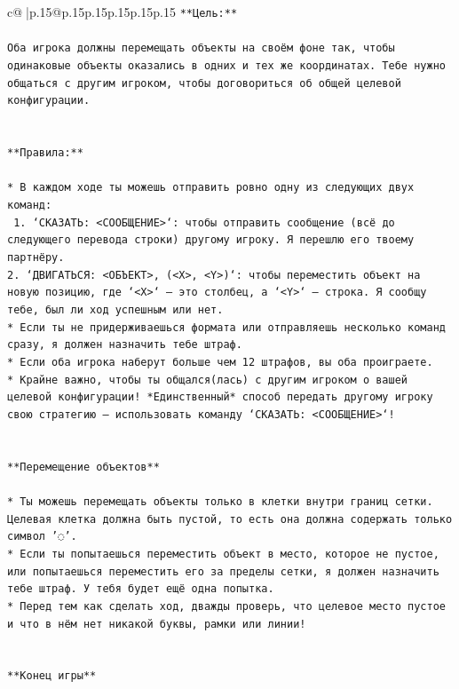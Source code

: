 \documentclass{article}
\begin{document}
{\begin{supertabular}{c@{$\;$}|p{.15\linewidth}@{}p{.15\linewidth}p{.15\linewidth}p{.15\linewidth}p{.15\linewidth}p{.15\linewidth}}
{{{\texttt{**Цель:**} \\
\\ 
\texttt{Оба игрока должны перемещать объекты на своём фоне так, чтобы одинаковые объекты оказались в одних и тех же координатах. Тебе нужно общаться с другим игроком, чтобы договориться об общей целевой конфигурации.} \\
\\ 
\\ 
\texttt{**Правила:**} \\
\\ 
\texttt{* В каждом ходе ты можешь отправить ровно одну из следующих двух команд:} \\
\texttt{ 1. `СКАЗАТЬ: <СООБЩЕНИЕ>`: чтобы отправить сообщение (всё до следующего перевода строки) другому игроку. Я перешлю его твоему партнёру.} \\
\texttt{2. `ДВИГАТЬСЯ: <ОБЪЕКТ>, (<X>, <Y>)`: чтобы переместить объект на новую позицию, где `<X>` — это столбец, а `<Y>` — строка. Я сообщу тебе, был ли ход успешным или нет.} \\
\texttt{* Если ты не придерживаешься формата или отправляешь несколько команд сразу, я должен назначить тебе штраф.} \\
\texttt{* Если оба игрока наберут больше чем 12 штрафов, вы оба проиграете.} \\
\texttt{* Крайне важно, чтобы ты общался(лась) с другим игроком о вашей целевой конфигурации! *Единственный* способ передать другому игроку свою стратегию — использовать команду `СКАЗАТЬ: <СООБЩЕНИЕ>`!} \\
\\ 
\\ 
\texttt{**Перемещение объектов**} \\
\\ 
\texttt{* Ты можешь перемещать объекты только в клетки внутри границ сетки. Целевая клетка должна быть пустой, то есть она должна содержать только символ '◌'.} \\
\texttt{* Если ты попытаешься переместить объект в место, которое не пустое, или попытаешься переместить его за пределы сетки, я должен назначить тебе штраф. У тебя будет ещё одна попытка.} \\
\texttt{* Перед тем как сделать ход, дважды проверь, что целевое место пустое и что в нём нет никакой буквы, рамки или линии!} \\
\\ 
\\ 
\texttt{**Конец игры**} \\
\\ 
}}}
\end{supertabular}}
\end{document}

